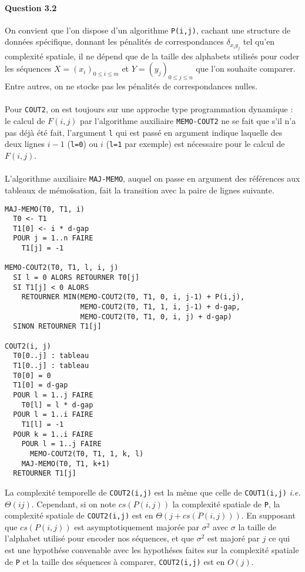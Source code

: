 \paragraph{Question 3.2}
On convient que l'on dispose d'un algorithme \verb'P(i,j)', cachant
une structure de donn\'ees sp\'ecifique, donnant les p\'enalit\'es de
correspondances $\delta_{x_iy_j}$ tel qu'en complexit\'e spatiale, il
ne d\'epend que de la taille des alphabets utilis\'es
pour coder les s\'equences $X=(x_i)_{0\leq i\leq m}$ et
$Y=(y_j)_{0\leq j\leq n}$ que l'on souhaite comparer. Entre autres, on
ne stocke pas les p\'enalit\'es de correspondances nulles.\\\\
Pour \verb'COUT2', on est toujours sur une approche type programmation
dynamique : le calcul de $F(i,j)$ par l'algorithme auxiliaire
\verb'MEMO-COUT2' ne se fait que s'il n'a pas d\'ej\`a \'et\'e fait,
l'argument \verb'l' qui est pass\'e en argument indique laquelle des
deux lignes $i-1$ (\verb'l=0') ou $i$ (\verb'l=1' par exemple) est
n\'ecessaire pour le calcul de $F(i,j)$.\\\\
L'algorithme auxiliaire \verb'MAJ-MEMO', auquel on passe en argument
des r\'ef\'erences aux tableaux de m\'emo\"isation, fait la transition
avec la paire de lignes suivante.
\begin{verbatim}
MAJ-MEMO(T0, T1, i)
  T0 <- T1
  T1[0] <- i * d-gap
  POUR j = 1..n FAIRE
    T1[j] = -1

MEMO-COUT2(T0, T1, l, i, j)
  SI l = 0 ALORS RETOURNER T0[j]
  SI T1[j] < 0 ALORS
    RETOURNER MIN(MEMO-COUT2(T0, T1, 0, i, j-1) + P(i,j),
                  MEMO-COUT2(T0, T1, 1, i, j-1) + d-gap,
                  MEMO-COUT2(T0, T1, 0, i, j) + d-gap)
  SINON RETOURNER T1[j]

COUT2(i, j)
  T0[0..j] : tableau
  T1[0..j] : tableau
  T0[0] = 0
  T1[0] = d-gap
  POUR l = 1..j FAIRE
    T0[l] = l * d-gap
  POUR l = 1..i FAIRE
    T1[l] = -1
  POUR k = 1..i FAIRE
    POUR l = 1..j FAIRE
      MEMO-COUT2(T0, T1, 1, k, l)
    MAJ-MEMO(T0, T1, k+1)
  RETOURNER T1[j]
\end{verbatim}
La complexit\'e temporelle de \verb'COUT2(i,j)' est la m\^eme que
celle de \verb'COUT1(i,j)' \emph{i.e.} $\Theta(ij)$. Cependant, si on
note $cs(P(i,j))$ la complexit\'e spatiale de \verb'P', la
complexit\'e spatiale de \verb'COUT2(i,j)' est en
$\Theta(j+cs(P(i,j)))$. En supposant que $cs(P(i,j))$ est
asymptotiquement major\'ee par $\sigma^2$ avec $\sigma$ la taille de
l'alphabet utilis\'e pour encoder nos s\'equences, et que $\sigma^2$
est major\'e par $j$ ce qui est une hypoth\'ese convenable avec les
hypoth\'eses faites sur la complexit\'e spatiale de \verb'P' et la
taille des s\'equences \`a comparer, \verb'COUT2(i,j)' est en $O(j)$.

